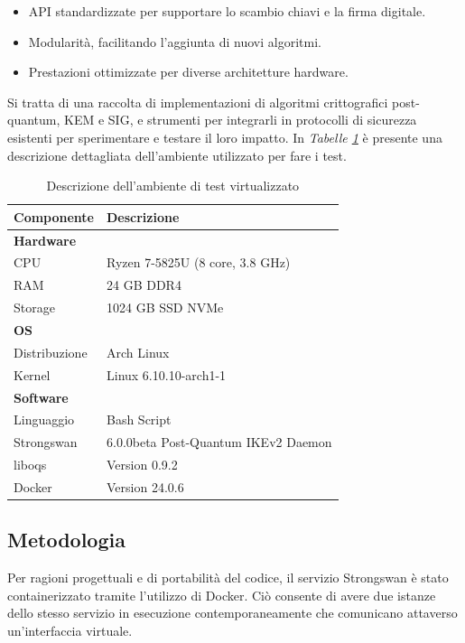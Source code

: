 \begin{itemize}
    \item API standardizzate per supportare lo scambio chiavi e la firma digitale. 
    \item Modularità, facilitando l'aggiunta di nuovi algoritmi. 
    \item Prestazioni ottimizzate per diverse architetture hardware.
\end{itemize}

\noindent
Si tratta di una raccolta di implementazioni di algoritmi crittografici post-quantum, KEM e SIG, e strumenti per integrarli in protocolli di sicurezza esistenti per sperimentare e testare il loro impatto.
In \textit{Tabelle \ref{tab:env}} è presente una descrizione dettagliata dell'ambiente utilizzato per fare i test.

\begin{table}[htbp] 
    \centering 
    \begin{tabular}{p{4cm} p{8cm}} 
        \toprule
        \textbf{Componente} & \textbf{Descrizione} \\ 
        \midrule
        \textbf{Hardware} & \\ 
        CPU & Ryzen 7-5825U (8 core, 3.8 GHz) \\ 
        RAM & 24 GB DDR4 \\ 
        Storage & 1024 GB SSD NVMe \\ 
        \textbf{OS} & \\ 
        Distribuzione & Arch Linux \\
        Kernel & Linux 6.10.10-arch1-1 \\ 
        \textbf{Software} & \\ 
        Linguaggio & Bash Script \\
        Strongswan & 6.0.0beta Post-Quantum IKEv2 Daemon \\
        liboqs & Version 0.9.2 \\
        Docker & Version 24.0.6 \\ 
        \hline 
    \end{tabular} 
    \caption{Descrizione dell'ambiente di test virtualizzato} 
    \label{tab:env}
\end{table}



\subsection{Metodologia}

Per ragioni progettuali e di portabilità del codice, il servizio Strongswan è stato 
containerizzato tramite l'utilizzo di Docker. Ciò consente di avere due istanze dello stesso
servizio in esecuzione contemporaneamente che comunicano attaverso un'interfaccia virtuale. 

